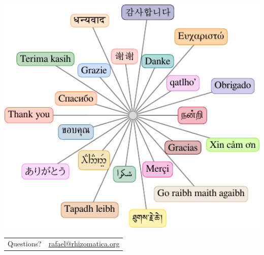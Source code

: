 \documentclass[aspectratio=169,xcolor={x11names,svgnames,dvipsnames}]{beamer}
\begin{document}





\begin{frame}
\centering
\includegraphics[width=.5\textwidth]{multiling-TQ}
\bigskip
\begin{tabular}{cl}
\multirow{3}{*}{\huge Questions?} & \textcolor{blue}{\url{rafael@rhizomatica.org}} \\
\end{tabular}

\end{frame}
\end{document}
